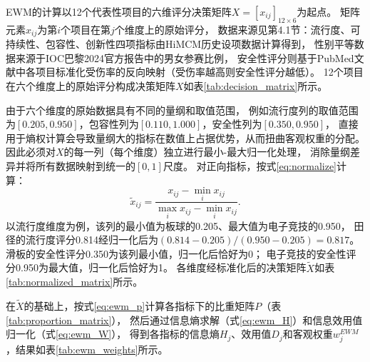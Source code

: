 \documentclass[twoside]{CUGThesis}
\begin{document}
EWM的计算以12个代表性项目的六维评分决策矩阵$X = [x_{ij}]_{12 \times 6}$为起点。
矩阵元素$x_{ij}$为第$i$个项目在第$j$个维度上的原始评分，
数据来源见第4.1节：流行度、可持续性、包容性、创新性四项指标由HiMCM历史设项数据计算得到，
性别平等数据来源于IOC巴黎2024官方报告中的男女参赛比例，
安全性评分则基于PubMed文献中各项目标准化受伤率的反向映射（受伤率越高则安全性评分越低）。
12个项目在六个维度上的原始评分构成决策矩阵$X$如表\ref{tab:decision_matrix}所示。

由于六个维度的原始数据具有不同的量纲和取值范围，
例如流行度列的取值范围为$[0.205, 0.950]$，包容性列为$[0.110, 1.000]$，安全性列为$[0.350, 0.950]$，
直接用于熵权计算会导致量纲大的指标在数值上占据优势，从而扭曲客观权重的分配。
因此必须对$X$的每一列（每个维度）独立进行最小-最大归一化处理，
消除量纲差异并将所有数据映射到统一的$[0, 1]$尺度。
对正向指标，按式\eqref{eq:normalize}计算：
\begin{equation}
\tilde{x}_{ij} = \frac{x_{ij} - \min_i x_{ij}}{\max_i x_{ij} - \min_i x_{ij}} .
\end{equation}
以流行度维度为例，该列的最小值为板球的0.205、最大值为电子竞技的0.950，
田径的流行度评分0.814经归一化后为$(0.814 - 0.205) / (0.950 - 0.205) = 0.817$。
滑板的安全性评分0.350为该列最小值，归一化后恰好为0；
电子竞技的安全性评分0.950为最大值，归一化后恰好为1。
各维度经标准化后的决策矩阵$\tilde{X}$如表\ref{tab:normalized_matrix}所示。

在$\tilde{X}$的基础上，按式\eqref{eq:ewm_p}计算各指标下的比重矩阵$P$（表\ref{tab:proportion_matrix}），
然后通过信息熵求解（式\eqref{eq:ewm_H}）和信息效用值归一化（式\eqref{eq:ewm_W}），
得到各指标的信息熵$H_j$、效用值$D_j$和客观权重$w_j^{EWM}$，结果如表\ref{tab:ewm_weights}所示。
\end{document}
